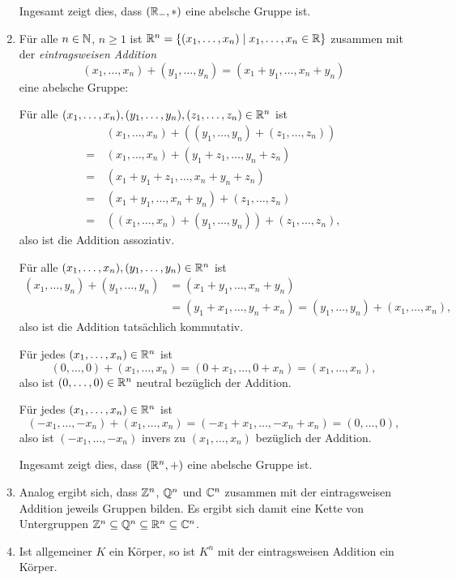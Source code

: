 \begin{enumerate}[leftmargin=*]
  Ingesamt zeigt dies, dass $(\mathbb{R}_-, *)$ eine abelsche Gruppe ist.
 \item
  Für alle $n \in \mathbb{N}$, $n \geq 1$ ist $\mathbb{R}^n = \{(x_1, \dotsc, x_n) \mid x_1, \dotsc, x_n \in \mathbb{R}\}$ zusammen mit der \emph{eintragsweisen Addition}
  \[
   (x_1, \dotsc, x_n) + (y_1, \dotsc, y_n)
   = (x_1 + y_1, \dotsc, x_n + y_n)
  \]
  eine abelsche Gruppe:
  
  Für alle $(x_1, \dotsc, x_n), (y_1, \dotsc, y_n), (z_1, \dotsc, z_n) \in \mathbb{R}^n$ ist
  \begin{align*}
    &\, (x_1, \dotsc, x_n) + ( (y_1, \dotsc, y_n) + (z_1, \dotsc, z_n) ) \\
   =&\, (x_1, \dotsc, x_n) + (y_1 + z_1, \dotsc, y_n + z_n) \\
   =&\, (x_1 + y_1 + z_1, \dotsc, x_n + y_n + z_n) \\
   =&\, (x_1 + y_1, \dotsc, x_n + y_n) + (z_1, \dotsc, z_n) \\
   =&\, ( (x_1, \dotsc, x_n) + (y_1, \dotsc, y_n) ) + (z_1, \dotsc, z_n),
  \end{align*}
  also ist die Addition assoziativ.
  
  Für alle $(x_1, \dotsc, x_n), (y_1, \dotsc, y_n) \in \mathbb{R}^n$ ist
  \begin{align*}
   (x_1, \dotsc, y_n) + (y_1, \dotsc, y_n)
   &= (x_1 + y_1, \dotsc, x_n + y_n) \\
   &= (y_1 + x_1, \dotsc, y_n + x_n)
   = (y_1, \dotsc, y_n) + (x_1, \dotsc, x_n),
  \end{align*}
  also ist die Addition tatsächlich kommutativ.
  
  Für jedes $(x_1, \dotsc, x_n) \in \mathbb{R}^n$ ist
  \[
   (0, \dotsc, 0) + (x_1, \dotsc, x_n)
   = (0 + x_1, \dotsc, 0 + x_n)
   = (x_1, \dotsc, x_n),
  \]
  also ist $(0, \dotsc, 0) \in \mathbb{R}^n$ neutral bezüglich der Addition.
  
  Für jedes $(x_1, \dotsc, x_n) \in \mathbb{R}^n$ ist
  \[
   (-x_1, \dotsc, -x_n) + (x_1, \dotsc, x_n)
   = (-x_1 + x_1, \dotsc, -x_n + x_n)
   = (0, \dotsc, 0),
  \]
  also ist $(-x_1, \dotsc, -x_n)$ invers zu $(x_1, \dotsc, x_n)$ bezüglich der Addition.
  
  Ingesamt zeigt dies, dass $(\mathbb{R}^n, +)$ eine abelsche Gruppe ist.
 \item
  Analog ergibt sich, dass $\mathbb{Z}^n$, $\mathbb{Q}^n$ und $\mathbb{C}^n$ zusammen mit der eintragsweisen Addition jeweils Gruppen bilden. Es ergibt sich damit eine Kette von Untergruppen $\mathbb{Z}^n \subseteq \mathbb{Q}^n \subseteq \mathbb{R}^n \subseteq \mathbb{C}^n$.
 \item
  Ist allgemeiner $K$ ein Körper, so ist $K^n$ mit der eintragsweisen Addition ein Körper.
\end{enumerate}



